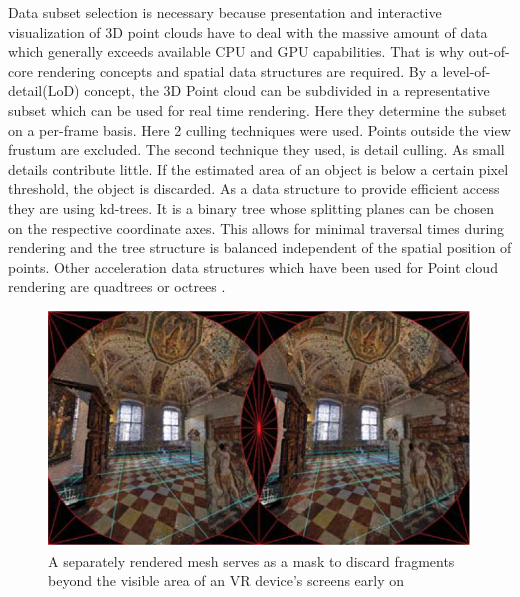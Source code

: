 \documentclass[10pt,twocolumn,letterpaper]{article}
\begin{document}
\setlength{\parindent}{1pc}Data subset selection is necessary because presentation and interactive visualization of 3D point clouds have to deal with the massive amount of data which generally exceeds available CPU and GPU capabilities. That is why out-of-core rendering concepts and spatial data structures are required. By a level-of-detail(LoD) concept, the 3D Point cloud can be subdivided in a representative subset which can be used for real time rendering. Here they determine the subset on a per-frame basis. Here 2 culling techniques were used. Points outside the view frustum are excluded. The second technique they used, is detail culling. As small details contribute little. If the estimated area of an object is below a certain pixel threshold, the object is discarded. As a data structure to provide efficient access they are using kd-trees. It is a binary tree whose splitting planes can be chosen on the respective coordinate axes. This allows for minimal traversal times during rendering and the tree structure is balanced independent of the spatial position of points. Other acceleration data structures which have been used for Point cloud rendering are quadtrees \cite{Gao:2014:VAL:2619648.2619672} or octrees \cite{kreylos2008immersive}.
\begin{figure}
		\includegraphics{pointcloud_3.png}
	\caption{A separately rendered mesh serves as a mask to discard fragments beyond the visible area of an VR device’s screens early on}
	\label{fig:pointcloud_2}
\end{figure}
\end{document}
